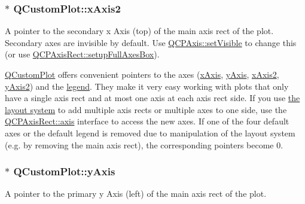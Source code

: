 \subsubsection[{\texorpdfstring{x\+Axis2}{xAxis2}}]{ $\ast$ Q\+Custom\+Plot\+::x\+Axis2}\hypertarget{classQCustomPlot_ada41599f22cad901c030f3dcbdd82fd9}{}\label{classQCustomPlot_ada41599f22cad901c030f3dcbdd82fd9}
A pointer to the secondary x Axis (top) of the main axis rect of the plot. Secondary axes are invisible by default. Use \hyperlink{classQCPLayerable_a3bed99ddc396b48ce3ebfdc0418744f8}{Q\+C\+P\+Axis\+::set\+Visible} to change this (or use \hyperlink{classQCPAxisRect_a5fa906175447b14206954f77fc7f1ef4}{Q\+C\+P\+Axis\+Rect\+::setup\+Full\+Axes\+Box}).

\hyperlink{classQCustomPlot}{Q\+Custom\+Plot} offers convenient pointers to the axes (\hyperlink{classQCustomPlot_a9a79cd0158a4c7f30cbc702f0fd800e4}{x\+Axis}, \hyperlink{classQCustomPlot_af6fea5679725b152c14facd920b19367}{y\+Axis}, \hyperlink{classQCustomPlot_ada41599f22cad901c030f3dcbdd82fd9}{x\+Axis2}, \hyperlink{classQCustomPlot_af13fdc5bce7d0fabd640f13ba805c0b7}{y\+Axis2}) and the \hyperlink{classQCustomPlot_a4eadcd237dc6a09938b68b16877fa6af}{legend}. They make it very easy working with plots that only have a single axis rect and at most one axis at each axis rect side. If you use \hyperlink{}{the layout system} to add multiple axis rects or multiple axes to one side, use the \hyperlink{classQCPAxisRect_a560de44e47a4af0f86c59102a094b1e4}{Q\+C\+P\+Axis\+Rect\+::axis} interface to access the new axes. If one of the four default axes or the default legend is removed due to manipulation of the layout system (e.\+g. by removing the main axis rect), the corresponding pointers become 0. 
\subsubsection[{\texorpdfstring{y\+Axis}{yAxis}}]{ $\ast$ Q\+Custom\+Plot\+::y\+Axis}\hypertarget{classQCustomPlot_af6fea5679725b152c14facd920b19367}{}\label{classQCustomPlot_af6fea5679725b152c14facd920b19367}
A pointer to the primary y Axis (left) of the main axis rect of the plot.

